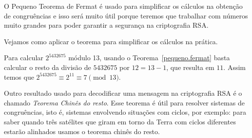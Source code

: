 O Pequeno Teorema de Fermat \'e usado para simplificar os c\'{a}lculos na obten\c{c}\~{a}o de congru\^encias e isso ser\'{a}
muito \'{u}til porque teremos que trabalhar com n\'{u}meros muito grandes para poder garantir a seguran\c{c}a na criptografia RSA.

Vejamos como aplicar o teorema para simplificar os c\'{a}lculos na pr\'{a}tica.

Para calcular $2^{5432675}$ m\'{o}dulo 13, usando o Teorema~\ref{pequeno.fermat} basta calcular o resto da 
divis\~{a}o de $5432675$ por $12=13-1$, que resulta em $11$.  Assim temos que $2^{5432675}\equiv 2^{11}\equiv 7 \pmod{13}$. 



Outro resultado usado para decodificar uma mensagem na criptografia RSA \'{e} o chamado \textit{Teorema Chin\^{e}s do resto}. Esse teorema
\'{e} \'{u}til para resolver sistemas de congru\^{e}ncias, isto \'{e}, sistemas envolvendo situa\c{c}\~{o}es com ciclos, por exemplo: para saber quando tr\^{e}s sat\'{e}lites que giram em torno da Terra com ciclos diferentes estar\~{a}o alinhados usamos o teorema chin\^es do resto. 

